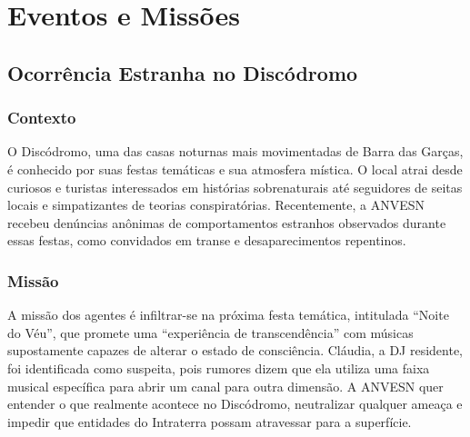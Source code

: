 \chapter{Eventos e Missões}

\section{Ocorrência Estranha no Discódromo}

\subsection{Contexto}
O Discódromo, uma das casas noturnas mais movimentadas de Barra das Garças, é conhecido por suas festas temáticas e sua atmosfera mística. O local atrai desde curiosos e turistas interessados em histórias sobrenaturais até seguidores de seitas locais e simpatizantes de teorias conspiratórias. Recentemente, a ANVESN recebeu denúncias anônimas de comportamentos estranhos observados durante essas festas, como convidados em transe e desaparecimentos repentinos.

\subsection{Missão}
A missão dos agentes é infiltrar-se na próxima festa temática, intitulada ``Noite do Véu'', que promete uma ``experiência de transcendência'' com músicas supostamente capazes de alterar o estado de consciência. Cláudia, a DJ residente, foi identificada como suspeita, pois rumores dizem que ela utiliza uma faixa musical específica para abrir um canal para outra dimensão. A ANVESN quer entender o que realmente acontece no Discódromo, neutralizar qualquer ameaça e impedir que entidades do Intraterra possam atravessar para a superfície.

